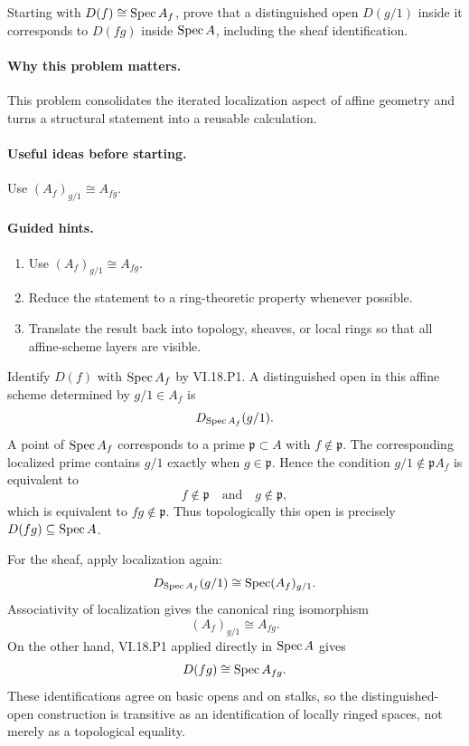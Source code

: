 \begin{problem}\label{prob:vi18-p19}
Starting with $D(f)\cong\operatorname{Spec} A_f$, prove that a distinguished open $D(g/1)$ inside it corresponds to $D(fg)$ inside $\operatorname{Spec} A$, including the sheaf identification.
\end{problem}

\ifdefined\FullProblemDossiers
\paragraph{Why this problem matters.}
This problem consolidates the iterated localization aspect of affine geometry and turns a structural statement into a reusable calculation.

\paragraph{Useful ideas before starting.}
Use $(A_f)_{g/1}\cong A_{fg}$.

\paragraph{Guided hints.}
\begin{enumerate}
\item Use $(A_f)_{g/1}\cong A_{fg}$.
\item Reduce the statement to a ring-theoretic property whenever possible.
\item Translate the result back into topology, sheaves, or local rings so that all affine-scheme layers are visible.
\end{enumerate}

\begin{solution}
Identify $D(f)$ with $\operatorname{Spec} A_f$ by VI.18.P1. A distinguished open in this affine scheme determined by $g/1\in A_f$ is
\[
D_{\operatorname{Spec} A_f}(g/1).
\]
A point of $\operatorname{Spec} A_f$ corresponds to a prime $\mathfrak p\subset A$ with $f\notin\mathfrak p$. The corresponding localized prime contains $g/1$ exactly when $g\in\mathfrak p$. Hence the condition $g/1\notin\mathfrak pA_f$ is equivalent to
\[
f\notin\mathfrak p\quad\text{and}\quad g\notin\mathfrak p,
\]
which is equivalent to $fg\notin\mathfrak p$. Thus topologically this open is precisely $D(fg)\subseteq\operatorname{Spec} A$.

For the sheaf, apply localization again:
\[
D_{\operatorname{Spec} A_f}(g/1)\cong\operatorname{Spec} (A_f)_{g/1}.
\]
Associativity of localization gives the canonical ring isomorphism
\[
(A_f)_{g/1}\cong A_{fg}.
\]
On the other hand, VI.18.P1 applied directly in $\operatorname{Spec} A$ gives
\[
D(fg)\cong\operatorname{Spec} A_{fg}.
\]
These identifications agree on basic opens and on stalks, so the distinguished-open construction is transitive as an identification of locally ringed spaces, not merely as a topological equality.
\end{solution}


